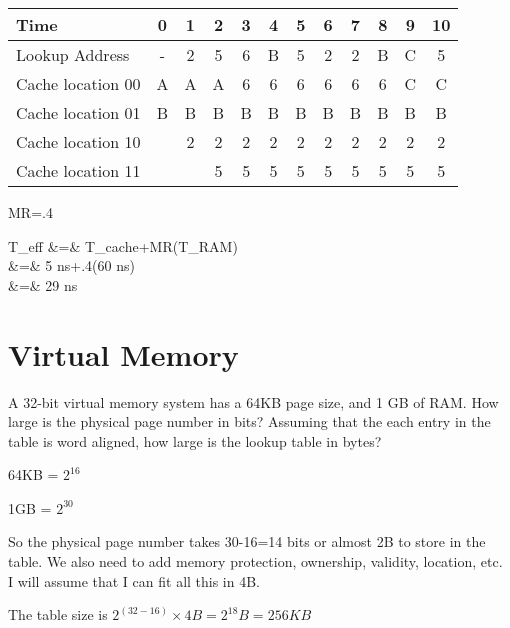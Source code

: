 {\color{ans}
\begin{tabular}{|l|c|c|c|c|c|c|c|c|c|c|c|} \hline
Time              & 0 & 1 & 2 & 3 & 4 & 5 & 6 & 7 & 8 & 9 & 10 \\ \hline
Lookup Address    & - & 2 & 5 & 6 & B & 5 & 2 & 2 & B & C & 5  \\ \hline
Cache location 00 & A & A & A & 6 & 6 & 6 & 6 & 6 & 6 & C & C  \\ \hline
Cache location 01 & B & B & B & B & B & B & B & B & B & B & B  \\ \hline
Cache location 10 &   & 2 & 2 & 2 & 2 & 2 & 2 & 2 & 2 & 2 & 2  \\ \hline
Cache location 11 &   &   & 5 & 5 & 5 & 5 & 5 & 5 & 5 & 5 & 5  \\ \hline
\end{tabular}

MR=.4

\beqn
T_{eff}
 &=& T_{cache}+MR(T_{RAM}) \\
 &=& 5 ns+.4(60 ns) \\
 &=& 29 ns
\eeqn
}



\section{Virtual Memory}

A 32-bit virtual memory system has a 64KB page size, and 1 GB of RAM.  How large is the physical page number in bits? Assuming that the each entry in the table is word aligned, how large is the lookup table in bytes?

{\color{ans}
64KB = $2^{16}$

1GB = $2^{30}$

So the physical page number takes 30-16=14 bits or almost 2B to store in the table.  We also need to add memory protection, ownership, validity, location, etc.  I will assume that I can fit all this in 4B.

The table size is $2^{(32-16)}\times 4 B = 2^{18} B = 256 KB$
} 